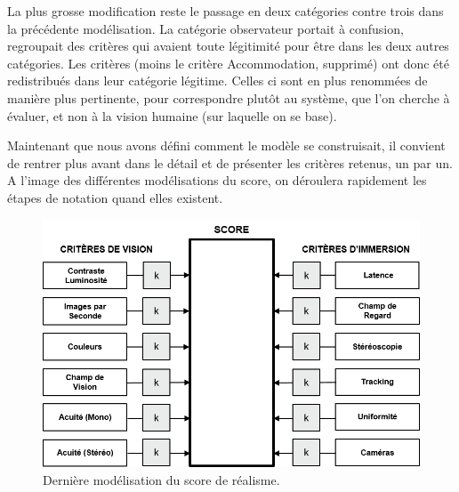 	\par La plus grosse modification reste le passage en deux catégories contre trois dans la précédente modélisation. La catégorie observateur portait à confusion, regroupait des critères qui avaient toute légitimité pour être dans les deux autres catégories. Les critères (moins le critère Accommodation, supprimé) ont donc été redistribués dans leur catégorie légitime. Celles ci sont en plus renommées de manière plus pertinente, pour correspondre plutôt au système, que l'on cherche à évaluer, et non à la vision humaine (sur laquelle on se base).
	
	\par Maintenant que nous avons défini comment le modèle se construisait, il convient de rentrer plus avant dans le détail et de présenter les critères retenus, un par un. A l'image des différentes modélisations du score, on déroulera rapidement les étapes de notation quand elles existent.
	
	\begin{figure}
		\centering
		\includegraphics[scale=1.1]{Figures/ModeleDefinitif_2}
		\caption{Dernière modélisation du score de réalisme.}
		\label{fig:modèle_définitif}
	\end{figure}